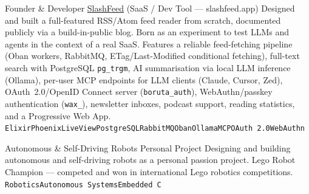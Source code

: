 \documentclass[9pt]{developercv}
\begin{document}


\begin{entrylist}
        {Founder \& Developer}
        {\href{https://slashfeed.app/}{SlashFeed} \textnormal{(SaaS / Dev Tool --- slashfeed.app)}}
        {Designed and built a full-featured RSS/Atom feed reader from scratch, documented publicly via a build-in-public blog. Born as an experiment to test LLMs and agents in the context of a real SaaS. Features a reliable feed-fetching pipeline (Oban workers, RabbitMQ, ETag/Last-Modified conditional fetching), full-text search with PostgreSQL \texttt{pg\_trgm}, AI summarisation via local LLM inference (Ollama), per-user MCP endpoints for LLM clients (Claude, Cursor, Zed), OAuth~2.0/OpenID Connect server (\texttt{boruta\_auth}), WebAuthn/passkey authentication (\texttt{wax\_}), newsletter inboxes, podcast support, reading statistics, and a Progressive Web App.\\
       \texttt{Elixir}\slashsep\texttt{Phoenix}\slashsep\texttt{LiveView}\slashsep\texttt{PostgreSQL}\slashsep\texttt{RabbitMQ}\slashsep\texttt{Oban}\slashsep\texttt{Ollama}\slashsep\texttt{MCP}\slashsep\texttt{OAuth 2.0}\slashsep\texttt{WebAuthn}}

        {Autonomous \& Self-Driving Robots}
        {Personal Project}
        {Designing and building autonomous and self-driving robots as a personal passion project. Lego Robot Champion --- competed and won in international Lego robotics competitions.\\
       \texttt{Robotics}\slashsep\texttt{Autonomous Systems}\slashsep\texttt{Embedded C}}
\end{entrylist}

\end{document}

